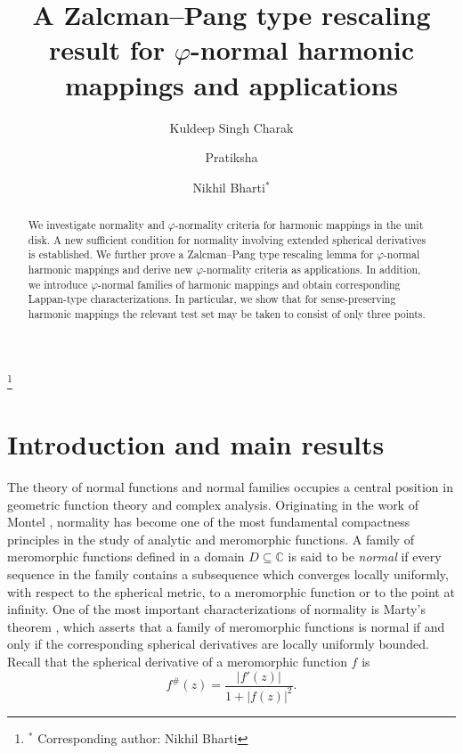 \documentclass[11pt,reqno]{amsart}
\theoremstyle{definition}
\newcommand{\C}{\mathbb{C}}
\begin{document}
\title[A Zalcman--Pang type rescaling result\dots]
{A Zalcman--Pang type rescaling result for $\varphi$-normal harmonic mappings and applications}

\author{Kuldeep Singh Charak}
\author{Pratiksha}
\author{Nikhil Bharti$^*$}
\thanks{$^*$ Corresponding author: Nikhil Bharti}



\begin{abstract}
We investigate normality and $\varphi$-normality criteria for harmonic mappings in the
unit disk. A new sufficient condition for normality involving extended spherical
derivatives is established. We further prove a Zalcman--Pang type rescaling lemma for
$\varphi$-normal harmonic mappings and derive new $\varphi$-normality criteria as
applications. In addition, we introduce $\varphi$-normal families of harmonic mappings
and obtain corresponding Lappan-type characterizations. In particular, we show that for
sense-preserving harmonic mappings the relevant test set may be taken to consist
of only three points.
\end{abstract}

\maketitle

\section{Introduction and main results}

The theory of normal functions and normal families occupies a central position in
geometric function theory and complex analysis. Originating in the work of Montel
\cite{Montel}, normality has become one of the most fundamental compactness principles in
the study of analytic and meromorphic functions. A family of meromorphic functions
defined in a domain $D\subseteq\C$ is said to be \emph{normal} if every sequence in the
family contains a subsequence which converges locally uniformly, with respect to the
spherical metric, to a meromorphic function or to the point at infinity. One of the most
important characterizations of normality is Marty's theorem \cite[Theorem~4]{Marty}, which
asserts that a family of meromorphic functions is normal if and only if the corresponding
spherical derivatives are locally uniformly bounded. Recall that the spherical derivative
of a meromorphic function $f$ is
\begin{equation}\label{eq:sphmero}
f^{\#}(z)=\frac{|f'(z)|}{1+|f(z)|^{2}}.
\end{equation}
\end{document}

